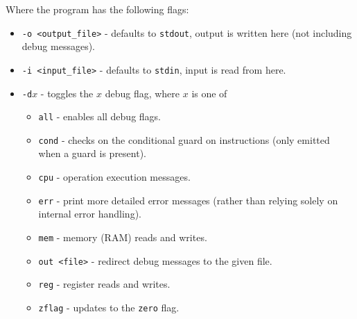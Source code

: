 \documentclass[10pt]{article}
\begin{document}
    Where the program has the following flags:
    \begin{itemize}
        \item \texttt{-o <output\_file>} - defaults to \texttt{stdout}, output is written here (not including debug messages).
        \item \texttt{-i <input\_file>} - defaults to \texttt{stdin}, input is read from here.
        \item \texttt{-d$x$} - toggles the $x$ debug flag, where $x$ is one of
        \begin{itemize}
            \item \texttt{all} - enables all debug flags.
            \item \texttt{cond} - checks on the conditional guard on instructions (only emitted when a guard is present).
            \item \texttt{cpu} - operation execution messages.
            \item \texttt{err} - print more detailed error messages (rather than relying solely on internal error handling).
            \item \texttt{mem} - memory (RAM) reads and writes.
            \item \texttt{out <file>} - redirect debug messages to the given file.
            \item \texttt{reg} - register reads and writes.
            \item \texttt{zflag} - updates to the \texttt{zero} flag.
        \end{itemize}
    \end{itemize}
\end{document}
